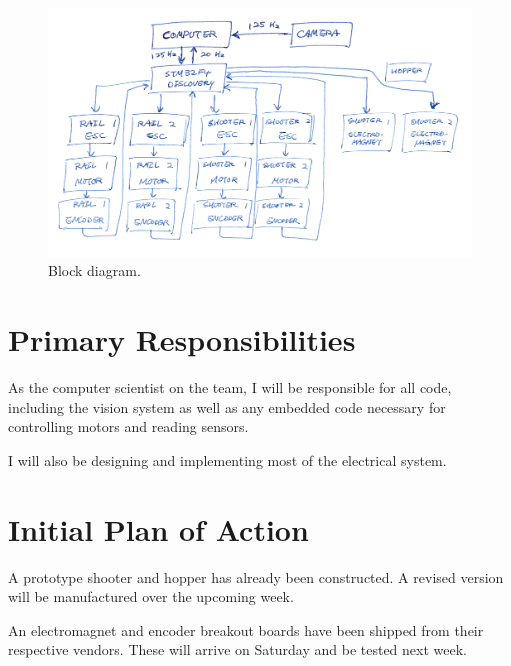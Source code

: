 \documentclass[10pt,letterpaper]{article}
\begin{document}
\begin{figure}[!h]
	\centering
	\includegraphics[width=1.0\textwidth]{block_diagram.png}
	\caption{Block diagram.}
	\label{fig:block}
\end{figure}


\newpage
\section*{Primary Responsibilities}

As the computer scientist on the team, I will be responsible for all code,
including the vision system as well as any embedded code necessary for
controlling motors and reading sensors.

I will also be designing and implementing most of the electrical system.


\section*{Initial Plan of Action}

A prototype shooter and hopper has already been constructed. A revised version
will be manufactured over the upcoming week.

An electromagnet and encoder breakout boards have been shipped from their
respective vendors. These will arrive on Saturday and be tested next week.
\end{document}
